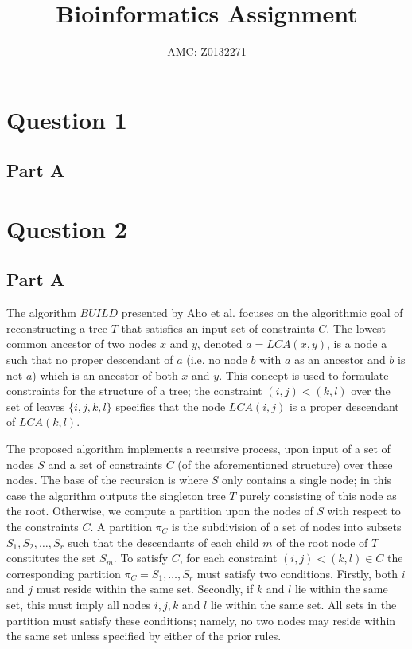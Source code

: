 \documentclass[a4paper, 11pt]{article}
\title{Bioinformatics Assignment}
\author{AMC: Z0132271}
\date{}
\begin{document}
	\maketitle
	\section{Question 1}
	\subsection{Part A}
	\label{section:1A}
	
	\section{Question 2}
	\subsection{Part A}
	\label{section:2A}
	The algorithm $BUILD$ presented by Aho et al. focuses on the algorithmic goal of reconstructing a tree $T$ that satisfies an input set of constraints $C$. The lowest common ancestor of two nodes $x$ and $y$, denoted $a = LCA(x, y)$, is a node a such that no proper descendant of $a$ (i.e. no node $b$ with $a$ as an ancestor and $b$ is not $a$) which is an ancestor of both $x$ and $y$. This concept is used to formulate constraints for the structure of a tree; the constraint $(i, j) < (k, l)$ over the set of leaves $\{i, j, k, l\}$ specifies that the node $LCA(i, j)$ is a proper descendant of $LCA(k, l)$.
	
	The proposed algorithm implements a recursive process, upon input of a set of nodes $S$ and a set of constraints $C$ (of the aforementioned structure) over these nodes. The base of the recursion is where $S$ only contains a single node; in this case the algorithm outputs the singleton tree $T$ purely consisting of this node as the root. Otherwise, we compute a partition upon the nodes of $S$ with respect to the constraints $C$. A partition $\pi_{C}$ is the subdivision of a set of nodes into subsets $S_{1}, S_{2}, \ldots, S_{r}$ such that the descendants of each child $m$ of the root node of $T$ constitutes the set $S_{m}$. To satisfy $C$, for each constraint $(i, j) < (k, l) \in C$ the corresponding partition $\pi_{C} = S_{1}, \ldots, S_{r}$ must satisfy two conditions. Firstly, both $i$ and $j$ must reside within the same set. Secondly, if $k$ and $l$ lie within the same set, this must imply all nodes $i, j, k$ and $l$ lie within the same set. All sets in the partition must satisfy these conditions; namely, no two nodes may reside within the same set unless specified by either of the prior rules.
	
\end{document}
